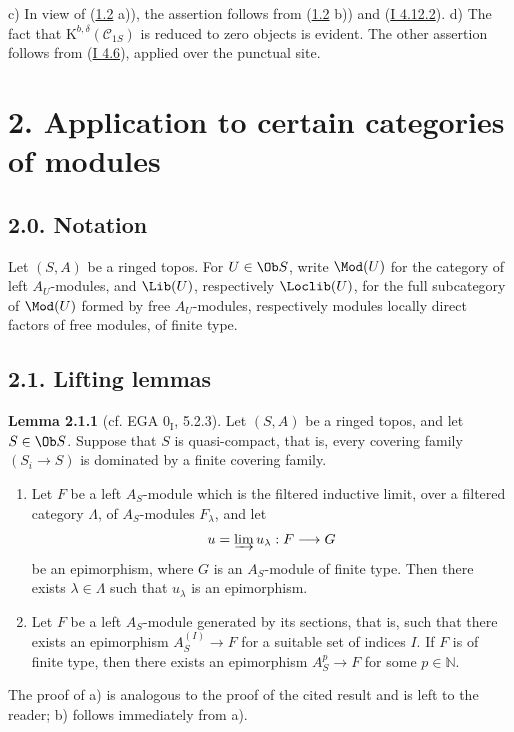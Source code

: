 c) In view of (\hyperlink{sga6.e02.prop.1-2}{1.2} a)), the assertion follows from (\hyperlink{sga6.e02.prop.1-2}{1.2} b)) and (\hyperlink{sga6.e01.rem.4-12-2}{I 4.12.2}). d) The fact that $\mathrm K^{b,\delta}(\mathcal C_{1S})$ is reduced to zero objects is evident. The other assertion follows from (\hyperlink{sga6.e01.cor.4-6}{I 4.6}), applied over the punctual site.

\section*{2. Application to certain categories of modules}

\subsection*{2.0. Notation}
Let $(S,A)$ be a ringed topos. For $U\in\Ob S$, write $\Mod(U)$ for the category of left $A_U$-modules, and $\Lib(U)$, respectively $\Loclib(U)$, for the full subcategory of $\Mod(U)$ formed by free $A_U$-modules, respectively modules locally direct factors of free modules, of finite type.

\subsection*{2.1. Lifting lemmas}

\textbf{Lemma 2.1.1} (cf. EGA $0_{\mathrm I}$, 5.2.3). Let $(S,A)$ be a ringed topos, and let $S\in\Ob S$. Suppose that $S$ is quasi-compact, that is, every covering family $(S_i\to S)$ is dominated by a finite covering family.
\begin{enumerate}[label=\alph*)]
\item Let $F$ be a left $A_S$-module which is the filtered inductive limit, over a filtered category $\Lambda$, of $A_S$-modules $F_\lambda$, and let
\[
u=\varinjlim u_\lambda:F\longrightarrow G
\]
be an epimorphism, where $G$ is an $A_S$-module of finite type. Then there exists $\lambda\in\Lambda$ such that $u_\lambda$ is an epimorphism.
\item Let $F$ be a left $A_S$-module generated by its sections, that is, such that there exists an epimorphism $A_S^{(I)}\to F$ for a suitable set of indices $I$. If $F$ is of finite type, then there exists an epimorphism $A_S^p\to F$ for some $p\in\mathbb N$.
\end{enumerate}
The proof of a) is analogous to the proof of the cited result and is left to the reader; b) follows immediately from a).

